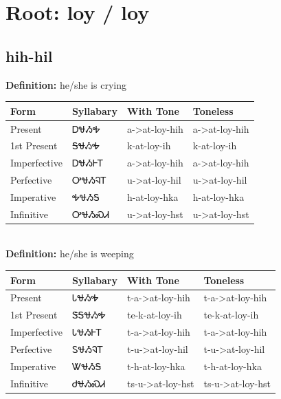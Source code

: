 \documentclass{article}%
\begin{document}
%
\normalsize%
\section*{Root: loy / loy}%
\subsection*{hih-hil}%
\textbf{Definition: }%
he/she is crying%
\\[0.5em]%
\begin{tabular}{|l|l|l|l|}%
\hline%
\textbf{Form}&\textbf{Syllabary}&\textbf{With Tone}&\textbf{Toneless}\\%
\hline%
Present&ᎠᏠᏱᎭ&a{-}>at{-}loy{-}hih&a{-}>at{-}loy{-}hih\\%
1st Present&ᎦᏠᏱᎭ&k{-}at{-}loy{-}ih&k{-}at{-}loy{-}ih\\%
Imperfective&ᎠᏠᏱᎰᎢ&a{-}>at{-}loy{-}hih&a{-}>at{-}loy{-}hih\\%
Perfective&ᎤᏠᏱᎸᎢ&u{-}>at{-}loy{-}hil&u{-}>at{-}loy{-}hil\\%
Imperative&ᎭᏠᏱᎦ&h{-}at{-}loy{-}hka&h{-}at{-}loy{-}hka\\%
Infinitive&ᎤᏠᏱᏍᏗ&u{-}>at{-}loy{-}hst&u{-}>at{-}loy{-}hst\\%
\hline%
\end{tabular}%
\\[1em]%
\textbf{Definition: }%
he/she is weeping%
\\[0.5em]%
\begin{tabular}{|l|l|l|l|}%
\hline%
\textbf{Form}&\textbf{Syllabary}&\textbf{With Tone}&\textbf{Toneless}\\%
\hline%
Present&ᏓᏠᏱᎭ&t{-}a{-}>at{-}loy{-}hih&t{-}a{-}>at{-}loy{-}hih\\%
1st Present&ᏕᎦᏠᏱᎭ&te{-}k{-}at{-}loy{-}ih&te{-}k{-}at{-}loy{-}ih\\%
Imperfective&ᏓᏠᏱᎰᎢ&t{-}a{-}>at{-}loy{-}hih&t{-}a{-}>at{-}loy{-}hih\\%
Perfective&ᏚᏠᏱᎸᎢ&t{-}u{-}>at{-}loy{-}hil&t{-}u{-}>at{-}loy{-}hil\\%
Imperative&ᏔᏠᏱᎦ&t{-}h{-}at{-}loy{-}hka&t{-}h{-}at{-}loy{-}hka\\%
Infinitive&ᏧᏠᏱᏍᏗ&ts{-}u{-}>at{-}loy{-}hst&ts{-}u{-}>at{-}loy{-}hst\\%
\hline%
\end{tabular}%
\\[1em]%
\end{document}
